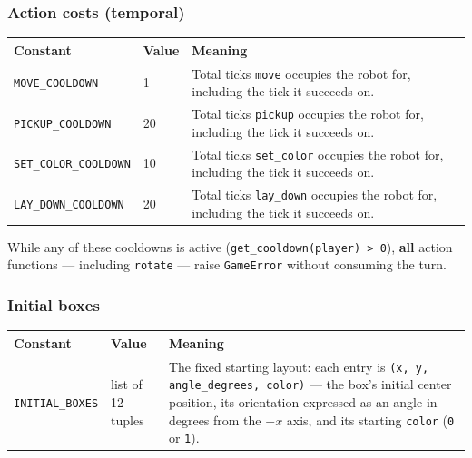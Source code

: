 \documentclass[11pt,a4paper]{article}
\newcommand{\code}[1]{\texttt{#1}}
\newcommand{\func}[1]{\texttt{#1}}
\begin{document}
\subsubsection*{Action costs (temporal)}
\begin{longtable}{p{4.7cm}p{2cm}p{8cm}}
\toprule
\textbf{Constant} & \textbf{Value} & \textbf{Meaning} \\
\midrule
\endhead
\code{MOVE\_COOLDOWN} & 1 & Total ticks \func{move} occupies the robot
    for, including the tick it succeeds on. \\
\code{PICKUP\_COOLDOWN} & 20 & Total ticks \func{pickup} occupies the
    robot for, including the tick it succeeds on. \\
\code{SET\_COLOR\_COOLDOWN} & 10 & Total ticks \func{set\_color}
    occupies the robot for, including the tick it succeeds on. \\
\code{LAY\_DOWN\_COOLDOWN} & 20 & Total ticks \func{lay\_down} occupies
    the robot for, including the tick it succeeds on. \\
\bottomrule
\end{longtable}

While any of these cooldowns is active (\code{get\_cooldown(player) > 0}),
\textbf{all} action functions --- including \func{rotate} --- raise
\code{GameError} without consuming the turn.

\subsubsection*{Initial boxes}
\begin{longtable}{p{4.7cm}p{2cm}p{8cm}}
\toprule
\textbf{Constant} & \textbf{Value} & \textbf{Meaning} \\
\midrule
\endhead
\code{INITIAL\_BOXES} & list of 12 tuples & The fixed starting layout: each
    entry is \code{(x, y, angle\_degrees, color)} --- the box's initial
    center position, its orientation expressed as an angle in degrees from
    the $+x$ axis,
    and its starting \code{color} (\code{0} or \code{1}).\\
\bottomrule
\end{longtable}
\end{document}
